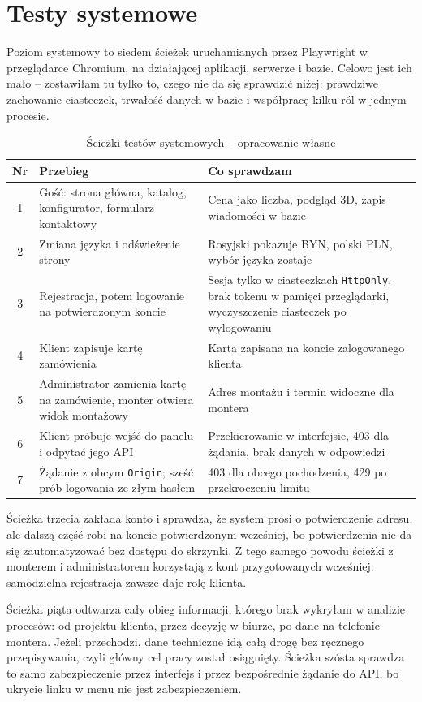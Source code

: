 \section{Testy systemowe}
\label{sec:testy-systemowe}

Poziom systemowy to siedem ścieżek uruchamianych przez Playwright w przeglądarce Chromium, na działającej aplikacji, serwerze i bazie. Celowo jest ich mało -- zostawiłam tu tylko to, czego nie da się sprawdzić niżej: prawdziwe zachowanie ciasteczek, trwałość danych w bazie i współpracę kilku ról w jednym procesie.

\begin{table}[htbp]
\centering
\caption{Ścieżki testów systemowych -- opracowanie własne}
\label{tab:sciezki-systemowe}
\begin{tabular}{|c|p{}|p{}|}
\hline
\textbf{Nr} & \textbf{Przebieg} & \textbf{Co sprawdzam} \\
\hline
1 & Gość: strona główna, katalog, konfigurator, formularz kontaktowy & Cena jako liczba, podgląd 3D, zapis wiadomości w bazie \\
\hline
2 & Zmiana języka i odświeżenie strony & Rosyjski pokazuje BYN, polski PLN, wybór języka zostaje \\
\hline
3 & Rejestracja, potem logowanie na potwierdzonym koncie & Sesja tylko w ciasteczkach \texttt{HttpOnly}, brak tokenu w pamięci przeglądarki, wyczyszczenie ciasteczek po wylogowaniu \\
\hline
4 & Klient zapisuje kartę zamówienia & Karta zapisana na koncie zalogowanego klienta \\
\hline
5 & Administrator zamienia kartę na zamówienie, monter otwiera widok montażowy & Adres montażu i termin widoczne dla montera \\
\hline
6 & Klient próbuje wejść do panelu i odpytać jego API & Przekierowanie w interfejsie, 403 dla żądania, brak danych w odpowiedzi \\
\hline
7 & Żądanie z obcym \texttt{Origin}; sześć prób logowania ze złym hasłem & 403 dla obcego pochodzenia, 429 po przekroczeniu limitu \\
\hline
\end{tabular}
\end{table}

Ścieżka trzecia zakłada konto i sprawdza, że system prosi o potwierdzenie adresu, ale dalszą część robi na koncie potwierdzonym wcześniej, bo potwierdzenia nie da się zautomatyzować bez dostępu do skrzynki. Z tego samego powodu ścieżki z monterem i administratorem korzystają z kont przygotowanych wcześniej: samodzielna rejestracja zawsze daje rolę klienta.

Ścieżka piąta odtwarza cały obieg informacji, którego brak wykryłam w analizie procesów: od projektu klienta, przez decyzję w biurze, po dane na telefonie montera. Jeżeli przechodzi, dane techniczne idą całą drogę bez ręcznego przepisywania, czyli główny cel pracy został osiągnięty. Ścieżka szósta sprawdza to samo zabezpieczenie przez interfejs i przez bezpośrednie żądanie do API, bo ukrycie linku w menu nie jest zabezpieczeniem.
